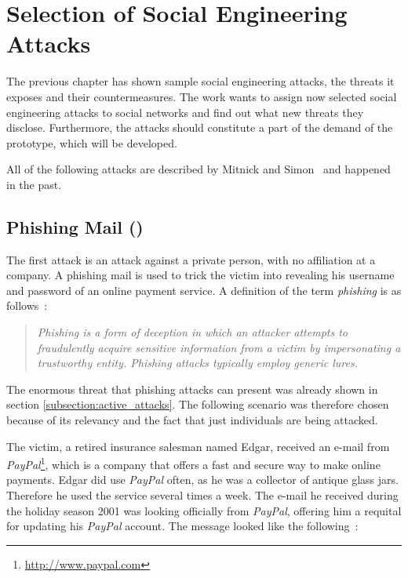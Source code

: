 \chapter{Selection of Social Engineering Attacks}
\label{chap:attacks}

The previous chapter has shown sample social engineering attacks, the
threats it exposes and their countermeasures. The work wants to assign now selected
social engineering attacks to social networks and find out what new threats
they disclose. Furthermore, the attacks should constitute a part of the demand
of the prototype, which will be developed.

All of the following attacks are described by Mitnick and
Simon~\cite{mitnick2003} and happened in the past.

\section[Phishing Mail]{Phishing Mail (\cite[pp. 97-100]{mitnick2003})}
\label{sec:phishing_mail}

The first attack is an attack against a private person, with no affiliation at
a company. A phishing mail is used to trick the victim into revealing his
username and password of an online payment service. A definition of the term
\textit{phishing} is as follows~\cite{jagatic2007}:

\begin{quote}
\textit{Phishing is a form of deception in which an attacker attempts to
fraudulently acquire sensitive information from a victim by impersonating a
trustworthy entity. Phishing attacks typically employ generic
\glqq{}lures\grqq{}.}
\end{quote}

The enormous threat that phishing attacks can present was already shown in
section \ref{subsection:active_attacks}. The following scenario was therefore
chosen because of its relevancy and the fact that just individuals are being
attacked.

The victim, a retired insurance salesman named Edgar, received an e-mail from
\textit{PayPal}\footnote{\url{http://www.paypal.com}}, which is a company that
offers a fast and secure way to make online payments. Edgar did use
\textit{PayPal} often, as he was a collector of antique glass jars. Therefore
he used the service several times a week. The e-mail he received during the
holiday season 2001 was looking officially from \textit{PayPal}, offering him a
requital for updating his \textit{PayPal} account. The message looked like the
following~\cite[p. 97]{mitnick2003}:

